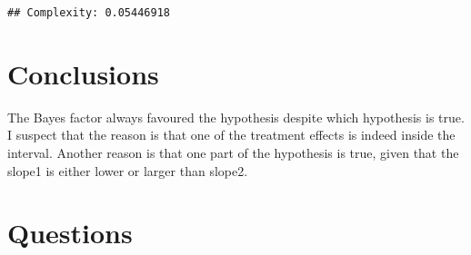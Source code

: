 \documentclass[
]{article}
\newenvironment{Shaded}{\begin{snugshade}}{\end{snugshade}}
\newcommand{\DecValTok}[1]{\textcolor[rgb]{0.00,0.00,0.81}{#1}}
\newcommand{\FunctionTok}[1]{\textcolor[rgb]{0.13,0.29,0.53}{\textbf{#1}}}
\newcommand{\NormalTok}[1]{#1}
\newcommand{\SpecialCharTok}[1]{\textcolor[rgb]{0.81,0.36,0.00}{\textbf{#1}}}
\newcommand{\StringTok}[1]{\textcolor[rgb]{0.31,0.60,0.02}{#1}}
\begin{document}
\begin{Shaded}
\end{Shaded}

\begin{verbatim}
## Complexity: 0.05446918
\end{verbatim}

\section{Conclusions}\label{conclusions}

The Bayes factor always favoured the hypothesis despite which hypothesis
is true. I suspect that the reason is that one of the treatment effects
is indeed inside the interval. Another reason is that one part of the
hypothesis is true, given that the slope1 is either lower or larger than
slope2.

\section{Questions}\label{questions}
\end{document}
